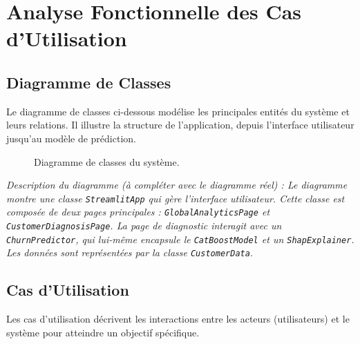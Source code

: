 \chapter{Analyse Fonctionnelle des Cas d’Utilisation}
\label{chap:analyse_fonctionnelle}

\section{Diagramme de Classes}
Le diagramme de classes ci-dessous modélise les principales entités du système et leurs relations. Il illustre la structure de l'application, depuis l'interface utilisateur jusqu'au modèle de prédiction.

\begin{figure}[H]
    \centering
    \caption{Diagramme de classes du système.}
    \label{fig:class_diagram}
\end{figure}

\textit{Description du diagramme (à compléter avec le diagramme réel) : Le diagramme montre une classe \texttt{StreamlitApp} qui gère l'interface utilisateur. Cette classe est composée de deux pages principales : \texttt{GlobalAnalyticsPage} et \texttt{CustomerDiagnosisPage}. La page de diagnostic interagit avec un \texttt{ChurnPredictor}, qui lui-même encapsule le \texttt{CatBoostModel} et un \texttt{ShapExplainer}. Les données sont représentées par la classe \texttt{CustomerData}.}

\section{Cas d’Utilisation}
Les cas d'utilisation décrivent les interactions entre les acteurs (utilisateurs) et le système pour atteindre un objectif spécifique.

